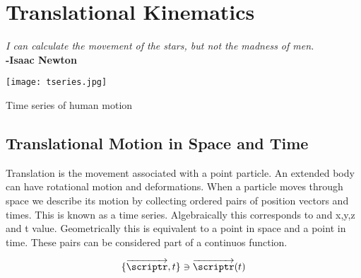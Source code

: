\chapter{Translational Kinematics}
\label{ch:kine}


\textit{I can calculate the movement of the stars, but not the madness of men.}  \\
\noindent\textbf{-Isaac Newton}

\begin{marginfigure}[0pt]%
  \texttt{[image: tseries.jpg]}
  \caption{Time series of human motion}
  \label{fig:marginfig}
\end{marginfigure}





\vspace{1cm}


\section{Translational Motion in Space and Time}
Translation is the movement associated with a point particle.  An extended body can have rotational motion and deformations.  When a particle moves through space we describe its motion by collecting ordered pairs of position vectors and times.  This is known as a time series.  Algebraically this corresponds to and x,y,z and t value.  Geometrically this is equivalent to a point in space and a point in time.  These pairs can be considered part of a continuos function.



$$\{\overrightarrow{\scriptr},t\}\ni\overrightarrow{\scriptr}(t)$$

